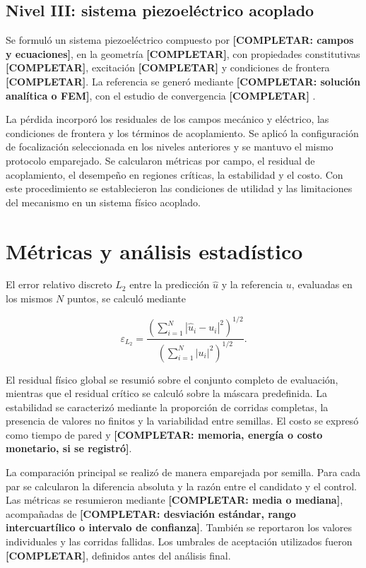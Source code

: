 \subsection{Nivel III: sistema piezoeléctrico acoplado}

Se formuló un sistema piezoeléctrico compuesto por \textbf{[COMPLETAR: campos y ecuaciones]}, en la geometría \textbf{[COMPLETAR]}, con propiedades constitutivas \textbf{[COMPLETAR]}, excitación \textbf{[COMPLETAR]} y condiciones de frontera \textbf{[COMPLETAR]}. La referencia se generó mediante \textbf{[COMPLETAR: solución analítica o FEM]}, con el estudio de convergencia \textbf{[COMPLETAR]} \cite{tandis2025piezoelectric,mouratidou2026shunted}.

La pérdida incorporó los residuales de los campos mecánico y eléctrico, las condiciones de frontera y los términos de acoplamiento. Se aplicó la configuración de focalización seleccionada en los niveles anteriores y se mantuvo el mismo protocolo emparejado. Se calcularon métricas por campo, el residual de acoplamiento, el desempeño en regiones críticas, la estabilidad y el costo. Con este procedimiento se establecieron las condiciones de utilidad y las limitaciones del mecanismo en un sistema físico acoplado.

\section{Métricas y análisis estadístico}
\label{subsec:metricas}

El error relativo discreto $L_2$ entre la predicción $\hat{u}$ y la referencia $u$, evaluadas en los mismos $N$ puntos, se calculó mediante

$$
\varepsilon_{L_2}=\frac{\left(\sum_{i=1}^{N}|\hat{u}_i-u_i|^2\right)^{1/2}}{\left(\sum_{i=1}^{N}|u_i|^2\right)^{1/2}}.
$$

El residual físico global se resumió sobre el conjunto completo de evaluación, mientras que el residual crítico se calculó sobre la máscara predefinida. La estabilidad se caracterizó mediante la proporción de corridas completas, la presencia de valores no finitos y la variabilidad entre semillas. El costo se expresó como tiempo de pared y \textbf{[COMPLETAR: memoria, energía o costo monetario, si se registró]}.

La comparación principal se realizó de manera emparejada por semilla. Para cada par se calcularon la diferencia absoluta y la razón entre el candidato y el control. Las métricas se resumieron mediante \textbf{[COMPLETAR: media o mediana]}, acompañadas de \textbf{[COMPLETAR: desviación estándar, rango intercuartílico o intervalo de confianza]}. También se reportaron los valores individuales y las corridas fallidas. Los umbrales de aceptación utilizados fueron \textbf{[COMPLETAR]}, definidos antes del análisis final.

